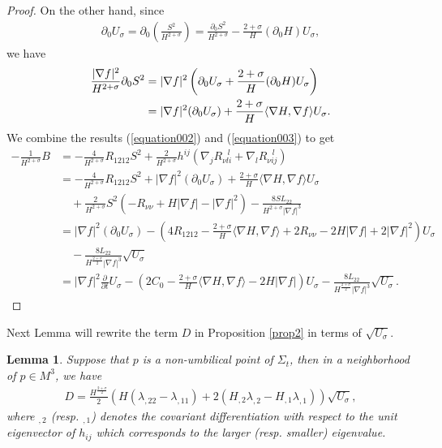\documentclass[12pt,a4paper]{amsart}
\newtheorem{Lma}{Lemma}
\begin{document}
\begin{proof}
On the other hand, since
\begin{align*}
\partial_0U_{\sigma}=\partial_0\left(\frac{S^2}{H^{2+\sigma}}\right)=\frac{\partial_0 S^2}{H^{2+\sigma}}-\frac{2+\sigma}{H}(\partial_0H)U_{\sigma},
\end{align*}
we have
\begin{align}
\frac{|\nabla f|^2}{H^{2+\sigma}}\partial_0 S^2
&=|\nabla f|^2\left(\partial_0 U_{\sigma}+\frac{2+\sigma}{H}(\partial_0H)U_{\sigma}\right) \notag \\
&=|\nabla f|^2(\partial_0U_{\sigma})+\frac{2+\sigma}{H}\langle \nabla H, \nabla f\rangle U_{\sigma}. \label{equation003}
\end{align}
We combine the results (\ref{equation002}) and (\ref{equation003}) to get
\begin{align*}
-\frac{1}{H^{2+\sigma}}B
&=-\frac{4}{H^{2+\sigma}}R_{1212}S^2+\frac{2}{H^{2+\sigma}}h^{ij}\left(\nabla_j R_{\nu li}^{\ \ \ l}+\nabla_l R_{\nu ij}^{\ \ \ l}\right) \\
&=-\frac{4}{H^{2+\sigma}}R_{1212}S^2+|\nabla f|^2(\partial_0U_\sigma)+\frac{2+\sigma}{H}\langle\nabla H,\nabla f\rangle U_{\sigma} \\
&\quad+\frac{2}{H^{2+\sigma}}S^2(-R_{\nu\nu}+H|\nabla f|-|\nabla f|^2)-\frac{8SL_{22}}{H^{2+\sigma}|\nabla f|^{3}} \\
&=|\nabla f|^2(\partial_0U_{\sigma})-\left(4R_{1212}-\frac{2+\sigma}{H}\langle\nabla H,\nabla f\rangle+2R_{\nu\nu}-2H|\nabla f|+2|\nabla f|^2\right)U_{\sigma} \\
&\quad-\frac{8L_{22}}{H^{\frac{2+\sigma}{2}}|\nabla f|^{3}}\sqrt{U_\sigma} \\
&=|\nabla f|^2\frac{\partial}{\partial t}U_{\sigma}
-\left(2C_0-\frac{2+\sigma}{H}\langle\nabla H,\nabla f\rangle-2H|\nabla f|\right)U_{\sigma}
-\frac{8L_{22}}{H^{\frac{2+\sigma}{2}}|\nabla f|^{3}}\sqrt{U_\sigma}.
\end{align*}
\end{proof}

Next Lemma will rewrite the term $D$ in Proposition \ref{prop2} in terms of $\sqrt{U_{\sigma}}$.
\begin{Lma} \label{D}
Suppose that $p$ is a non-umbilical point of $\Sigma_t$, then in a neighborhood of $p\in M^3$, we have
\begin{align*}
D=\frac{H^{\frac{2+\sigma}{2}}}{2}\left(H(\lambda_{,22}-\lambda_{,11})+2(H_{,2}\lambda_{,2}-H_{,1}\lambda_{,1})\right)\sqrt{U_\sigma},
\end{align*}
where $_{,2}$ (resp. $_{,1}$) denotes the covariant differentiation with respect to the unit eigenvector of
$h_{ij}$ which corresponds to the larger (resp. smaller) eigenvalue.
\end{Lma}
\end{document}
